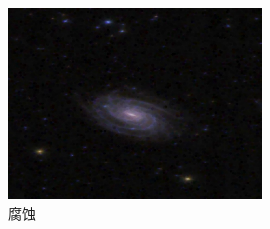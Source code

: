 \documentclass[11pt]{ctexart}
\begin{document}
\begin{figure}[htbp]
{            \begin{minipage}[t]{0.4\linewidth}
            \centering
            \includegraphics[width=0.6\textwidth]{output/2.1_2.jpg}
            \end{minipage}
        }
        \centering
        \caption{腐蚀}\label{fig:digit}
  \end{figure}
\end{document}
